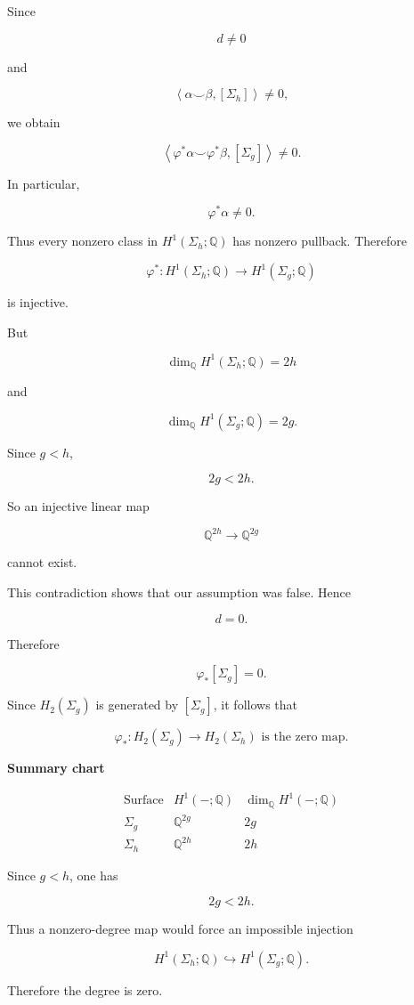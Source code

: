 \begin{solution}
Since

\[
d\neq 0
\]

and

\[
\left\langle \alpha\smile \beta,[\Sigma_h]\right\rangle\neq 0,
\]

we obtain

\[
\left\langle \varphi^*\alpha\smile \varphi^*\beta,[\Sigma_g]\right\rangle\neq 0.
\]

In particular,

\[
\varphi^*\alpha\neq 0.
\]

Thus every nonzero class in \(H^1(\Sigma_h;\mathbb Q)\) has nonzero pullback. Therefore

\[
\varphi^*:H^1(\Sigma_h;\mathbb Q)\to H^1(\Sigma_g;\mathbb Q)
\]

is injective.

But

\[
\dim_{\mathbb Q}H^1(\Sigma_h;\mathbb Q)=2h
\]

and

\[
\dim_{\mathbb Q}H^1(\Sigma_g;\mathbb Q)=2g.
\]

Since \(g<h\),

\[
2g<2h.
\]

So an injective linear map

\[
\mathbb Q^{2h}\longrightarrow \mathbb Q^{2g}
\]

cannot exist.

This contradiction shows that our assumption was false. Hence

\[
d=0.
\]

Therefore

\[
\varphi_*[\Sigma_g]=0.
\]

Since \(H_2(\Sigma_g)\) is generated by \([\Sigma_g]\), it follows that

\[
\boxed{
	\varphi_*:H_2(\Sigma_g)\longrightarrow H_2(\Sigma_h)
	\text{ is the zero map.}
}
\]


\medskip
\noindent\textbf{Summary chart}\par
\smallskip


\[
\begin{array}{c|c|c}
	\text{Surface} & H^1(-;\mathbb Q) & \dim_{\mathbb Q}H^1(-;\mathbb Q) \\
	\hline
	\Sigma_g & \mathbb Q^{2g} & 2g \\
	\Sigma_h & \mathbb Q^{2h} & 2h
\end{array}
\]

Since \(g<h\), one has

\[
2g<2h.
\]

Thus a nonzero-degree map would force an impossible injection

\[
H^1(\Sigma_h;\mathbb Q)\hookrightarrow H^1(\Sigma_g;\mathbb Q).
\]

Therefore the degree is zero.
\end{solution}

